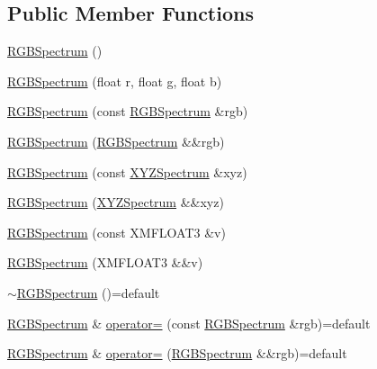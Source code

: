 \subsection*{Public Member Functions}
\begin{DoxyCompactItemize}
\item 
\hyperlink{structmage_1_1_r_g_b_spectrum_ac9ebcf270e9572fd0af180f50b7ceb10}{R\+G\+B\+Spectrum} ()
\item 
\hyperlink{structmage_1_1_r_g_b_spectrum_aae798159a0ea02e95347918ef881b3aa}{R\+G\+B\+Spectrum} (float r, float g, float b)
\item 
\hyperlink{structmage_1_1_r_g_b_spectrum_a5cf405a5fbaa641a421df5767d2847b4}{R\+G\+B\+Spectrum} (const \hyperlink{structmage_1_1_r_g_b_spectrum}{R\+G\+B\+Spectrum} \&rgb)
\item 
\hyperlink{structmage_1_1_r_g_b_spectrum_a866ef0a3fe393f853d969e00a4c02086}{R\+G\+B\+Spectrum} (\hyperlink{structmage_1_1_r_g_b_spectrum}{R\+G\+B\+Spectrum} \&\&rgb)
\item 
\hyperlink{structmage_1_1_r_g_b_spectrum_a7c87ee10a81c55b1954915c1abea0cb9}{R\+G\+B\+Spectrum} (const \hyperlink{structmage_1_1_x_y_z_spectrum}{X\+Y\+Z\+Spectrum} \&xyz)
\item 
\hyperlink{structmage_1_1_r_g_b_spectrum_ad3307598d8156374483f66c0d3492b90}{R\+G\+B\+Spectrum} (\hyperlink{structmage_1_1_x_y_z_spectrum}{X\+Y\+Z\+Spectrum} \&\&xyz)
\item 
\hyperlink{structmage_1_1_r_g_b_spectrum_a384140c69360958401c170d0a3565d97}{R\+G\+B\+Spectrum} (const X\+M\+F\+L\+O\+A\+T3 \&v)
\item 
\hyperlink{structmage_1_1_r_g_b_spectrum_a0b4e081df4474826e0b124e74025f715}{R\+G\+B\+Spectrum} (X\+M\+F\+L\+O\+A\+T3 \&\&v)
\item 
\hyperlink{structmage_1_1_r_g_b_spectrum_a7c18a007349953b1e4711a4856680b02}{$\sim$\+R\+G\+B\+Spectrum} ()=default
\item 
\hyperlink{structmage_1_1_r_g_b_spectrum}{R\+G\+B\+Spectrum} \& \hyperlink{structmage_1_1_r_g_b_spectrum_ac4701cc62489d27130853c3ba667a767}{operator=} (const \hyperlink{structmage_1_1_r_g_b_spectrum}{R\+G\+B\+Spectrum} \&rgb)=default
\item 
\hyperlink{structmage_1_1_r_g_b_spectrum}{R\+G\+B\+Spectrum} \& \hyperlink{structmage_1_1_r_g_b_spectrum_a3a487cd0fcb35395c0979552dc551829}{operator=} (\hyperlink{structmage_1_1_r_g_b_spectrum}{R\+G\+B\+Spectrum} \&\&rgb)=default
\end{DoxyCompactItemize}


